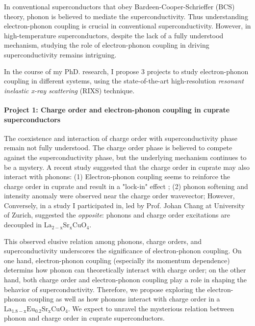 \documentclass[11pt]{article}
\begin{document}
In conventional superconductors that obey Bardeen-Cooper-Schrieffer (BCS) theory, phonon is believed to mediate the superconductivity\cite{bardeen_theory_1957}. Thus understanding electron-phonon coupling is crucial in conventional superconductivity. However, in high-temperature superconductors, despite the lack of a fully understood mechanism, studying the role of electron-phonon coupling in driving superconductivity remains intriguing.

In the course of my PhD. research, I propose 3 projects to study electron-phonon coupling in different systems, using the state-of-the-art high-resolution \textit{resonant inelastic x-ray scattering} (RIXS) technique\cite{ament_resonant_2011,zhou_i21_2022}. 

\paragraph{Project 1: Charge order and electron-phonon coupling in cuprate superconductors}
The coexistence and interaction of charge order with superconductivity phase remain not fully understood. The charge order phase is believed to compete against the superconductivity phase\cite{arpaia_charge_2021,comin_resonant_2016,canosa_resonant_2014, hucker_competing_2014, chang_direct_2012,ghiringhelli_long-range_2012}, but the underlying mechanism continues to be a mystery. A recent study suggested that the charge order in cuprate may also interact with phonons: (1) Electron-phonon coupling seems to reinforce the charge order in cuprate and result in a "lock-in" effect \cite{wang_charge_2021}; (2) phonon softening and intensity anomaly were observed near the charge order wavevector\cite{wang_charge_2021,lin_strongly_2020, huang_quantum_2021,miao_incommensurate_2018,tacon_inelastic_2014,li_multiorbital_2020,braicovich_determining_2020,chaix_dispersive_2017,peng_enhanced_2020};  However, Conversely, in a study I participated in, led by Prof. Johan Chang at University of Zurich, suggested the \textit{opposite}: phonons and charge order excitations are decoupled in $\mathrm{La_{2-x}Sr_xCuO_4}$.

This observed elusive relation among phonons, charge orders, and superconductivity underscores the significance of electron-phonon coupling. On one hand, electron-phonon coupling (especially its momentum dependence) determins how phonon can theoretically interact with charge order; on the other hand, both charge order and electron-phonon coupling play a role in shaping the behavior of superconductivity. Therefore, we propose exploring the electron-phonon coupling as well as how phonons interact with charge order in a $\mathrm{La_{1.8-x}Eu_{0.2}Sr_xCuO_{4}}$. We expect to unravel the mysterious relation between phonon and charge order in cuprate superconductors. 
\end{document}
